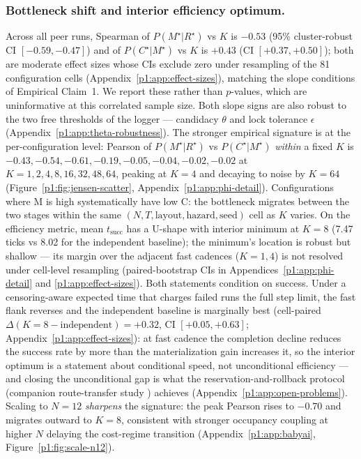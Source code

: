 \documentclass{article}
\begin{document}
\subsubsection{Bottleneck shift and interior efficiency optimum.}
Across all peer runs, Spearman of $P(M^\star|R^\star)$ vs $K$ is $-0.53$ (95\% cluster-robust CI $[-0.59,-0.47]$) and of $P(C^\star|M^\star)$ vs $K$ is $+0.43$ (CI $[+0.37,+0.50]$); both are moderate effect sizes whose CIs exclude zero under resampling of the 81 configuration cells (Appendix~\ref{p1:app:effect-sizes}), matching the slope conditions of Empirical Claim~1. We report these rather than $p$-values, which are uninformative at this correlated sample size. Both slope signs are also robust to the two free thresholds of the logger --- candidacy $\theta$ and lock tolerance $\epsilon$ (Appendix~\ref{p1:app:theta-robustness}). The stronger empirical signature is at the per-configuration level: Pearson of $P(M^\star|R^\star)$ vs $P(C^\star|M^\star)$ \emph{within} a fixed $K$ is $-0.43, -0.54, -0.61, -0.19, -0.05, -0.04, -0.02, -0.02$ at $K{=}1,2,4,8,16,32,48,64$, peaking at $K{=}4$ and decaying to noise by $K{=}64$ (Figure~\ref{p1:fig:jensen-scatter}, Appendix~\ref{p1:app:phi-detail}). Configurations where M is high systematically have low C: the bottleneck migrates between the two stages within the same $(N,T,\text{layout},\text{hazard},\text{seed})$ cell as $K$ varies. On the efficiency metric, mean $t_{\mathrm{succ}}$ has a U-shape with interior minimum at $K{=}8$ (7.47 ticks vs 8.02 for the independent baseline); the minimum's location is robust but shallow --- its margin over the adjacent fast cadences ($K{=}1,4$) is not resolved under cell-level resampling (paired-bootstrap CIs in Appendices~\ref{p1:app:phi-detail} and \ref{p1:app:effect-sizes}). Both statements condition on success. Under a censoring-aware expected time that charges failed runs the full step limit, the fast flank reverses and the independent baseline is marginally best (cell-paired $\Delta(K{=}8-\text{independent}) = +0.32$, CI $[+0.05,+0.63]$; Appendix~\ref{p1:app:effect-sizes}): at fast cadence the completion decline reduces the success rate by more than the materialization gain increases it, so the interior optimum is a statement about conditional speed, not unconditional efficiency --- and closing the unconditional gap is what the reservation-and-rollback protocol (companion route-transfer study \citep{songlines2}) achieves (Appendix~\ref{p1:app:open-problems}). Scaling to $N{=}12$ \emph{sharpens} the signature: the peak Pearson rises to $-0.70$ and
migrates outward to $K\!=\!8$, consistent with stronger occupancy
coupling at higher $N$ delaying the cost-regime transition
(Appendix~\ref{p1:app:babyai}, Figure~\ref{p1:fig:scale-n12}).
\end{document}
